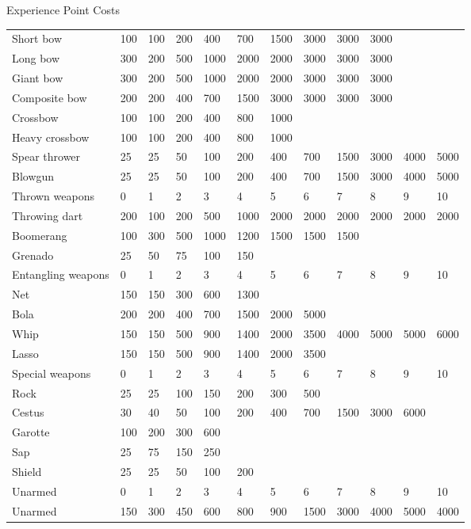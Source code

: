 \begin{Table}{Experience Point Costs}
\begin{tabularx}{\linewidth}{Xlllllllllll}
Short bow		& 100	& 100 	& 200	& 400	& 700	& 1500	& 3000	& 3000	& 3000	& 	&  \\
Long bow		& 300	& 200 	& 500	& 1000	& 2000	& 2000	& 3000	& 3000	& 3000	& 	&  \\
Giant bow		& 300	& 200 	& 500	& 1000	& 2000	& 2000	& 3000	& 3000	& 3000	& 	&  \\
Composite bow		& 200	& 200 	& 400	& 700	& 1500	& 3000	& 3000	& 3000	& 3000	& 	&  \\
Crossbow		& 100	& 100 	& 200	& 400	& 800	& 1000	& 	& 	& 	& 	&  \\
Heavy crossbow		& 100	& 100 	& 200	& 400	& 800	& 1000	& 	& 	& 	& 	&  \\
Spear thrower		& 25	& 25 	& 50	& 100	& 200	& 400	& 700	& 1500	& 3000	& 4000	& 5000 \\
Blowgun			& 25	& 25 	& 50	& 100	& 200	& 400	& 700	& 1500	& 3000	& 4000	& 5000 \\ \hline
Thrown weapons		& 0	& 1 	& 2	& 3	& 4	& 5	& 6	& 7	& 8	& 9	& 10 \\
Throwing dart		& 200	& 100 	& 200	& 500	& 1000	& 2000	& 2000	& 2000	& 2000	& 2000	& 2000 \\
Boomerang		& 100	& 300 	& 500	& 1000	& 1200	& 1500	& 1500	& 1500	& 	& 	&  \\
Grenado			& 25	& 50 	& 75	& 100	& 150	& 	& 	& 	& 	& 	&  \\ \hline
Entangling weapons	& 0	& 1	& 2	& 3	& 4	& 5 	& 6	& 7	& 8	& 9	& 10 \\ \hline
Net			& 150	& 150 	& 300	& 600	& 1300	& 	& 	& 	& 	& 	&  \\
Bola			& 200	& 200	& 400	& 700	& 1500	& 2000	& 5000	& 	& 	& 	&  \\
Whip			& 150	& 150 	& 500	& 900	& 1400	& 2000	& 3500	& 4000	& 5000	& 5000	& 6000 \\
Lasso			& 150	& 150	& 500	& 900	& 1400	& 2000	& 3500	& 	& 	& 	&  \\
Special weapons		& 0	& 1 	& 2	& 3	& 4	& 5	& 6	& 7	& 8	& 9	& 10 \\
Rock			& 25	& 25 	& 100	& 150	& 200	& 300	& 500	& 	& 	& 	&  \\
Cestus			& 30	& 40	& 50	& 100	& 200	& 400	& 700	& 1500	& 3000	& 6000	&  \\
Garotte			& 100	& 200	& 300	& 600	& 	& 	& 	& 	& 	& 	&  \\
Sap			& 25	& 75	& 150	& 250	& 	& 	& 	& 	& 	& 	&  \\
Shield			& 25	& 25	& 50	& 100	& 200	& 	& 	& 	& 	& 	&  \\ \hline
Unarmed			& 0	& 1 	& 2	& 3	& 4	& 5	& 6	& 7	& 8	& 9	& 10 \\ \hline
Unarmed			& 150	& 300 	& 450	& 600	& 800	& 900	& 1500	& 3000	& 4000	& 5000	& 4000 \\
\end{tabularx}



\end{Table}
